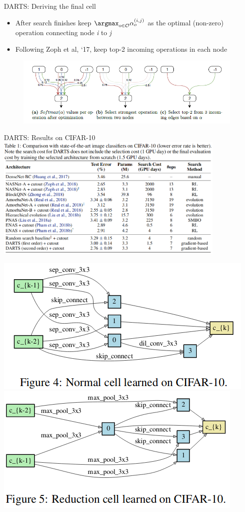 \begin{frame}{DARTS: Deriving the final cell}
    \begin{itemize}
        \item After search finishes keep $\argmax_{o\in\mathcal{O}}\alpha_{o}^{(i,j)}$ as the optimal (non-zero) operation connecting node \textit{i} to \textit{j}
        \item Following Zoph et al, ‘17, keep top-2 incoming operations in each node
    \end{itemize}

    \begin{figure}[t]
        \begin{centering}
            \includegraphics[scale=0.55]{images_lec7/genotype.png}
        \end{centering}
    \end{figure}

\end{frame}

\begin{frame}{DARTS: Results on CIFAR-10}
\centering
\includegraphics[width=0.85\textwidth]{images_lec7/darts_cnn_results.png}

\includegraphics[width=.35\textwidth]{images_lec7/darts_normal_cell.png}
\includegraphics[width=.35\textwidth]{images_lec7/darts_reduction_cell.png}

\end{frame}
